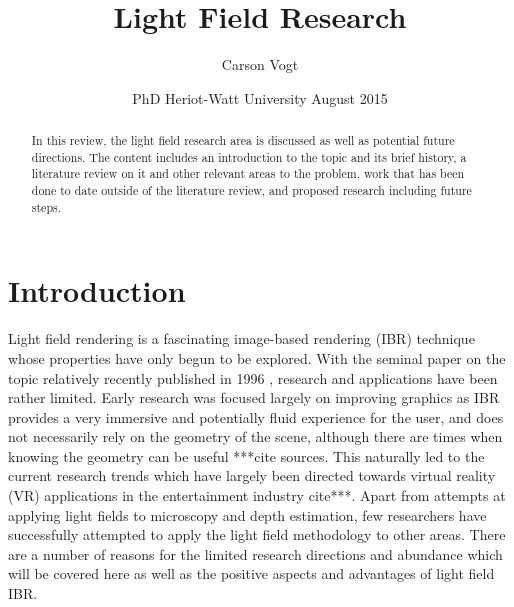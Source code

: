 \documentclass[12pt]{report}
\begin{document}
\title{Light Field Research \vspace{2.5cm}}	%
\author{
\Large Carson Vogt \vspace{1cm} \\ 
}

\date{
	\centering
	PhD \endgraf\medskip
	Heriot-Watt University \endgraf{} August 2015
}

\maketitle

\begin{abstract}
\begin{small}
In this review, the light field research area is discussed as well as potential future directions. The content includes an introduction to the topic and its brief history, a literature review on it and other relevant areas to the problem, work that has been done to date outside of the literature review, and proposed research including future steps.
\end{small}
\end{abstract}

\listoffigures

\tableofcontents

\chapter{Introduction}
Light field rendering is a fascinating image-based rendering (IBR) technique whose properties have only begun to be explored. With the seminal paper on the topic relatively recently published in 1996 \cite{Levoy96}, research and applications have been rather limited. Early research was focused largely on improving graphics as IBR provides a very immersive and potentially fluid experience for the user, and does not necessarily rely on the geometry of the scene, although there are times when knowing the geometry can be useful ***cite sources. This naturally led to the current research trends which have largely been directed towards virtual reality (VR) applications in the entertainment industry cite***. Apart from attempts at applying light fields to microscopy and depth estimation, few researchers have successfully attempted to apply the light field methodology to other areas. There are a number of reasons for the limited research directions and abundance which will be covered here as well as the positive aspects and advantages of light field IBR.
\end{document}
